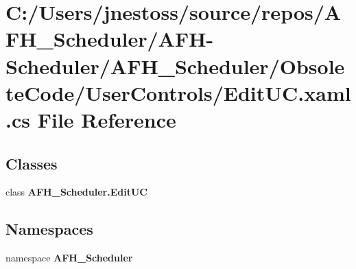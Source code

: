 \section{C\+:/\+Users/jnestoss/source/repos/\+A\+F\+H\+\_\+\+Scheduler/\+A\+F\+H-\/\+Scheduler/\+A\+F\+H\+\_\+\+Scheduler/\+Obsolete\+Code/\+User\+Controls/\+Edit\+UC.xaml.\+cs File Reference}
\label{_edit_u_c_8xaml_8cs}
\subsection*{Classes}
\begin{DoxyCompactItemize}
\item 
class \textbf{ A\+F\+H\+\_\+\+Scheduler.\+Edit\+UC}
\end{DoxyCompactItemize}
\subsection*{Namespaces}
\begin{DoxyCompactItemize}
\item 
namespace \textbf{ A\+F\+H\+\_\+\+Scheduler}
\end{DoxyCompactItemize}

